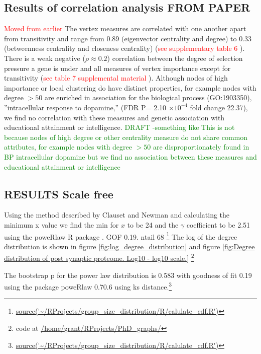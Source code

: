\subsection{Results of correlation analysis FROM PAPER}
\textcolor{red}{Moved from earlier}
The vertex measures are correlated with one another apart from transitivity and range from 0.89 (eigenvector centrality and degree) to 0.33 (betweenness centrality and closeness centrality) (\textcolor{red}{see supplementary table 6} ).
There is a weak negative ($\rho \approx 0.2$) correlation between 
the degree of selection pressure a gene is under and all measures of vertex importance except for transitivity (\textcolor{red}{see table 7 supplemental material} ).
Although nodes of high importance or local clustering do have distinct properties, for example nodes with degree $> 50$ are enriched in association for the biological process (GO:1903350)‚ ”intracellular response to dopamine‚” (FDR P= 2.10 $\times 10^{-4}$ fold change 22.37), we find no correlation with these measures and genetic association with educational attainment or intelligence. 
\textcolor{green}{DRAFT -something like This is not because nodes of high degree or other centrality measure do not share common attributes, for example nodes with degree $>50$ are disproportionately found in BP intracellular dopamine but we find no association between these measures and educational attainment or intelligence}



\subsection{RESULTS Scale free}
Using the method described by Clauset and Newman \cite{clauset2009power} and calculating the minimum x value we find the min for $x$ to be 24 and the $\gamma$ coefficient to be 2.51 using the poweRlaw R package \cite{gillespie2015fitting}. GOF 0.19. ntail 68 \footnote{\url{source('~/RProjects/group_size_distribution/R/calulate_cdf.R')}} The log of the degree distribution is shown in figure \ref{fig:log_degree_distribution} and figure \ref{fig:Degree distribution of post synaptic proteome. Log10 - log10 scale.}
\footnote{code at \url{/home/grant/RProjects/PhD_graphs/}}


The bootstrap p for the power law distribution is 0.583 with goodness of fit 0.19 using the package poweRlaw 0.70.6 using ks distance.\footnote{\url{source('~/RProjects/group_size_distribution/R/calulate_cdf.R')}}


